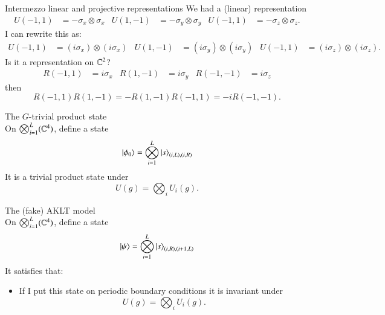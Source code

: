 \documentclass{beamer}
\begin{document}
\begin{frame}{Intermezzo linear and projective representations}
	We had a (linear) representation
	\begin{align*}
			U(-1,1)&=-\sigma_x\otimes \sigma_x&U(1,-1)&=-\sigma_y\otimes \sigma_y&U(-1,1)&=-\sigma_z\otimes \sigma_z.
	\end{align*}
	\pause
	I can rewrite this as:\\
	\begin{align*}
	U(-1,1)&=(i\sigma_x)\otimes (i\sigma_x)&U(1,-1)&=(i\sigma_y)\otimes (i\sigma_y)&U(-1,1)&=(i\sigma_z)\otimes (i\sigma_z).
	\end{align*}
	\pause
	Is it a representation on $\mathbb{C}^2$?
	\pause
	\begin{align}
		R(-1,1)&=i\sigma_x&R(1,-1)&=i\sigma_y&R(-1,-1)&=i\sigma_z
	\end{align}
	then
	\begin{equation*}
		R(-1,1)R(1,-1)=-R(1,-1)R(-1,1)=-i R(-1,-1).
	\end{equation*}
\end{frame}

\begin{frame}{The $G$-trivial product state}
	\\
	On $\bigotimes_{i=1}^L(\mathbb{C}^4)$, define a state
	\begin{equation*}
		\ket{\phi_0}=\bigotimes_{i=1}^L\ket{s}_{(i,L),(i,R)}
	\end{equation*}
	\pause
	It is a trivial product state under
	\begin{equation*}
		U(g)=\bigotimes_i U_i(g).
	\end{equation*}
\end{frame}

\begin{frame}{The (fake) AKLT model}
	\\
	On $\bigotimes_{i=1}^L(\mathbb{C}^4)$, define a state
	\begin{equation*}
		\ket{\psi}=\bigotimes_{i=1}^L\ket{s}_{(i,R),(i+1,L)}
	\end{equation*}
	\pause
	It satisfies that:
	\begin{itemize}
		\item If I put this state on periodic boundary conditions it is invariant under
		\begin{equation*}
			U(g)=\bigotimes_i U_i(g).
		\end{equation*}
	\end{itemize}
\end{frame}
\end{document}
